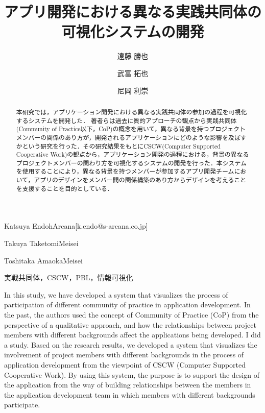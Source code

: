 \documentclass[submit,techrep]{ipsj}
\begin{document}
\title{アプリ開発における異なる実践共同体の\\
可視化システムの開発}




\author{遠藤 勝也}{Katsuya Endoh}{Arcana}[k.endo@s-arcana.co.jp]
\author{武富 拓也}{Takuya Taketomi}{Meisei}
\author{尼岡 利崇}{Toshitaka Amaoka}{Meisei}

\begin{abstract}
本研究では，アプリケーション開発における異なる実践共同体の参加の過程を可視化するシステムを開発した．
著者らは過去に質的アプローチの観点から実践共同体(Community of Practice以下，CoP)の概念を用いて，異なる背景を持つプロジェクトメンバーの関係のあり方が，開発されるアプリケーションにどのような影響を及ぼすかという研究を行った．その研究結果をもとにCSCW(Computer Supported Cooperative Work)の観点から，アプリケーション開発の過程における，背景の異なるプロジェクトメンバーの関わり方を可視化するシステムの開発を行った．本システムを使用することにより，異なる背景を持つメンバーが参加するアプリ開発チームにおいて，アプリのデザインをメンバー間の関係構築のあり方からデザインを考えることを支援することを目的としている．
\end{abstract}


\begin{jkeyword}
実戦共同体，CSCW，PBL，情報可視化
\end{jkeyword}

\begin{eabstract}
In this study, we have developed a system that visualizes the process of participation of different community of practice in application development.
In the past, the authors used the concept of Community of Practice (CoP) from the perspective of a qualitative approach, and how the relationships between project members with different backgrounds affect the applications being developed. I did a study. Based on the research results, we developed a system that visualizes the involvement of project members with different backgrounds in the process of application development from the viewpoint of CSCW (Computer Supported Cooperative Work). By using this system, the purpose is to support the design of the application from the way of building relationships between the members in the application development team in which members with different backgrounds participate.
\end{eabstract}
\end{document}
